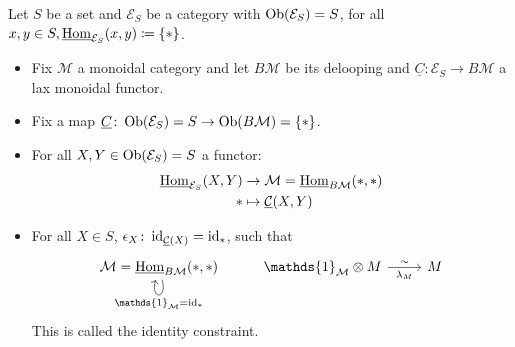 \begin{exmp}
	Let $ S $ be a set and $ \mathcal{ E }_S$ be a category with $ \operatorname{Ob} ( \mathcal{ E }_S ) = S $, for all $ x , y \in S, \underline{ \operatorname{Hom} }_{ \mathcal{ E }_S } ( x , y ) \coloneqq \{ *
	\}$.
	\begin{itemize}
		\item 	
		Fix $ \mathcal{ M } $ a monoidal category and let $ B \mathcal{ M } $ be its delooping and $ \underline{ C } \colon \mathcal{ E }_S \to B \mathcal{ M }$ a lax monoidal functor.
		
		\item 
		Fix a map $ \underline{ C } \colon \operatorname{Ob} ( \mathcal{ E }_S )= S \to \operatorname{Ob} ( B \mathcal{ M } ) = \{ * \}$.
		
		\item 
		For all $ X , Y \in \operatorname{Ob} ( \mathcal{ E }_S ) = S $ a functor: 
		\begin{align*}
				\underline{ \operatorname{Hom} }_{ \mathcal{ E }_S } ( X , Y )
				&\to
				\mathcal{ M } = \underline{ \operatorname{Hom} }_{ B \mathcal{ M } } ( * , * )
				\\
				*
				&\mapsto
				\underline{ \mathcal{ C } } ( X  , Y )
		\end{align*} 
		
		\item 
		For all $ X  \in S $, $ \epsilon_X \colon \operatorname{id}_{ \underline{ \mathcal{ C } } ( X ) } = \operatorname{id}_*$, such that 
		\[
		\begin{tikzcd}
			\mathcal{ M } = \underline{ \Hom }_{ B \mathcal{ M } } ( * , * )
			\ar[loop below, " \mathds{ 1 }_{ \mathcal{ M } } = \id_* "]
			&
			\mathds{ 1 }_{ \mathcal{ M } } \otimes M 
			\ar[r, "\sim", "\lambda_M"']
			&
			M
		\end{tikzcd}
		\]
		This is called the identity constraint.
		

\end{itemize}
\end{exmp}
